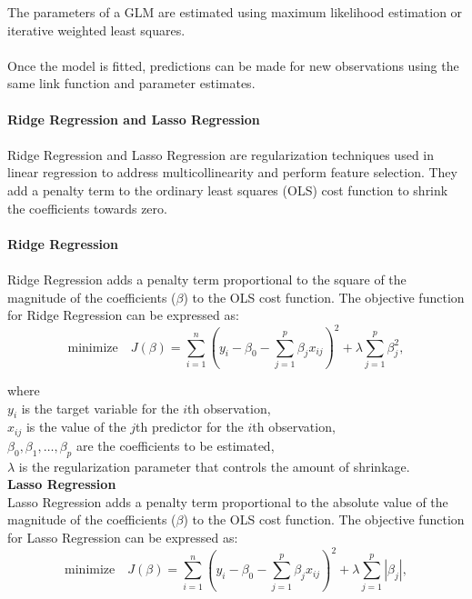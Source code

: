 \documentclass[12pt]{report}
\begin{document}
\noindent The parameters of a GLM are estimated using maximum likelihood estimation or iterative weighted
least squares.\\
\\
Once the model is fitted, predictions can be made for new observations using the same
link function and parameter estimates.\\
\\
\textbf{Ridge Regression and Lasso Regression}\\
\\
Ridge Regression and Lasso Regression are regularization techniques used in linear regression
to address multicollinearity and perform feature selection. They add a penalty term to the
ordinary least squares (OLS) cost function to shrink the coefficients towards zero.\\
\\
\textbf{Ridge Regression}\\
\\
Ridge Regression adds a penalty term proportional to the square of the magnitude of the
coefficients (\(\beta\)) to the OLS cost function. The objective function for Ridge Regression
can be expressed as:\\

\begin{equation}
    \text{minimize} \quad J(\beta) = \sum_{i=1}^{n} (y_i - \beta_0 - \sum_{j=1}^{p} \beta_j x_{ij})^2 + \lambda \sum_{j=1}^{p} \beta_j^2,
\end{equation}

\noindent where\\
\(y_i\) is the target variable for the \(i\)th observation,\\
\(x_{ij}\) is the value of the \(j\)th predictor for the \(i\)th observation,\\
\(\beta_0, \beta_1, \ldots, \beta_p\) are the coefficients to be estimated,\\
\(\lambda\) is the regularization parameter that controls the amount of shrinkage.\\

\noindent
\textbf{Lasso Regression}\\
Lasso Regression adds a penalty term proportional to the absolute value of the
magnitude of the coefficients (\(\beta\)) to the OLS cost function. The objective
function for Lasso Regression can be expressed as:\\

\begin{equation}
    \text{minimize} \quad J(\beta) = \sum_{i=1}^{n} (y_i - \beta_0 - \sum_{j=1}^{p} \beta_j x_{ij})^2 + \lambda \sum_{j=1}^{p} |\beta_j|,
\end{equation}
\end{document}
